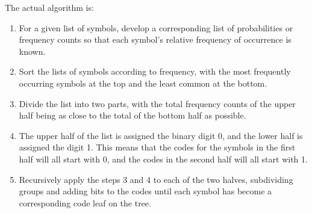 \documentclass[12pt, a4paper]{report}
\begin{document}
The actual algorithm is:

\begin{enumerate}
  \item For a given list of symbols, develop a corresponding list of probabilities or frequency counts so that each symbol's
  relative frequency of occurrence is known.
  \item Sort the lists of symbols according to frequency, with the most frequently occurring symbols at the top and the least
  common at the bottom.
  \item Divide the list into two parts, with the total frequency counts of the upper half being as close to the total of the
  bottom half as possible.
  \item The upper half of the list is assigned the binary digit 0, and the lower half is assigned the digit 1. This means
  that the codes for the symbols in the first half will all start with 0, and the codes in the second half will all start
  with 1.
  \item Recursively apply the steps 3 and 4 to each of the two halves, subdividing groups and adding bits to the codes
  until each symbol has become a corresponding code leaf on the tree.
\end{enumerate}
\end{document}
